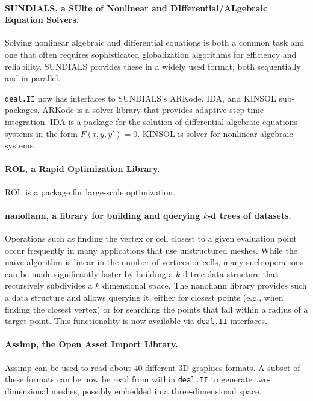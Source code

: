 \documentclass{ansarticle-preprint}
\newcommand{\specialword}[1]{\texttt{#1}}
\newcommand{\dealii}{{\specialword{deal.II}}}
\begin{document}
\paragraph*{SUNDIALS, a SUite of Nonlinear and DIfferential/ALgebraic
  Equation Solvers.}
  Solving nonlinear algebraic and differential equations is both a
  common task and one that often requires sophisticated globalization
  algorithms for efficiency and reliability. SUNDIALS provides these
  in a widely used format, both sequentially and in parallel.
  
  \dealii{} now has interfaces to SUNDIALS's ARKode, IDA, and KINSOL sub-packages.
  ARKode is a solver library that provides adaptive-step time
  integration. IDA is a package for the solution of differential-algebraic
  equations systems in the form $F(t,y,y')=0$. KINSOL is solver for nonlinear
  algebraic systems.

\paragraph*{ROL, a Rapid Optimization Library.}
ROL is a package for large-scale optimization.
  
\paragraph*{nanoflann, a library for building and querying
  $k$-d trees of datasets.} Operations such as finding the vertex
or cell closest
to a given evaluation point occur frequently in many applications that
use unstructured meshes. While the naive algorithm is linear in the
number of vertices or cells, many such operations can be made
significantly faster by building a $k$-d tree data structure that
recursively subdivides a $k$ dimensional space. The nanoflann library
provides such a data structure and allows querying it, either for
closest points (e.g., when finding the closest vertex) or for
searching the points that fall within a radius of a target point. This
functionality is now available via \dealii{} interfaces.

\paragraph*{Assimp, the Open Asset Import Library.}
  Assimp can be used to read about 40 different 3D graphics formats. A
  subset of these formats can be now be read from within \dealii{} to
  generate two-dimensional meshes, possibly embedded in a
  three-dimensional space.
\end{document}
